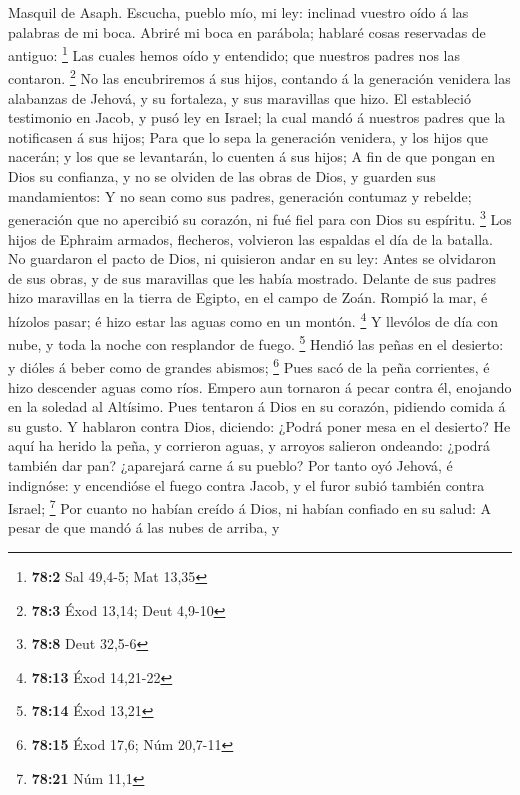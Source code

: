  Masquil de Asaph. Escucha, pueblo mío, mi ley: inclinad
vuestro oído á las palabras de mi boca.  Abriré mi boca en
parábola; hablaré cosas reservadas de antiguo: \footnote{\textbf{78:2}
  Sal 49,4-5; Mat 13,35}  Las cuales hemos oído y entendido;
que nuestros padres nos las contaron. \footnote{\textbf{78:3} Éxod
  13,14; Deut 4,9-10}  No las encubriremos á sus hijos,
contando á la generación venidera las alabanzas de Jehová, y su
fortaleza, y sus maravillas que hizo.  El estableció
testimonio en Jacob, y pusó ley en Israel; la cual mandó á nuestros
padres que la notificasen á sus hijos;  Para que lo sepa la
generación venidera, y los hijos que nacerán; y los que se levantarán,
lo cuenten á sus hijos;  A fin de que pongan en Dios su
confianza, y no se olviden de las obras de Dios, y guarden sus
mandamientos:  Y no sean como sus padres, generación
contumaz y rebelde; generación que no apercibió su corazón, ni fué fiel
para con Dios su espíritu. \footnote{\textbf{78:8} Deut 32,5-6}
 Los hijos de Ephraim armados, flecheros, volvieron las
espaldas el día de la batalla.  No guardaron el pacto de
Dios, ni quisieron andar en su ley:  Antes se olvidaron de
sus obras, y de sus maravillas que les había mostrado. 
Delante de sus padres hizo maravillas en la tierra de Egipto, en el
campo de Zoán.  Rompió la mar, é hízolos pasar; é hizo
estar las aguas como en un montón. \footnote{\textbf{78:13} Éxod
  14,21-22}  Y llevólos de día con nube, y toda la noche
con resplandor de fuego. \footnote{\textbf{78:14} Éxod 13,21}
 Hendió las peñas en el desierto: y dióles á beber como de
grandes abismos; \footnote{\textbf{78:15} Éxod 17,6; Núm 20,7-11}
 Pues sacó de la peña corrientes, é hizo descender aguas
como ríos.  Empero aun tornaron á pecar contra él, enojando
en la soledad al Altísimo.  Pues tentaron á Dios en su
corazón, pidiendo comida á su gusto.  Y hablaron contra
Dios, diciendo: ¿Podrá poner mesa en el desierto?  He aquí
ha herido la peña, y corrieron aguas, y arroyos salieron ondeando:
¿podrá también dar pan? ¿aparejará carne á su pueblo?  Por
tanto oyó Jehová, é indignóse: y encendióse el fuego contra Jacob, y el
furor subió también contra Israel; \footnote{\textbf{78:21} Núm 11,1}
 Por cuanto no habían creído á Dios, ni habían confiado en
su salud:  A pesar de que mandó á las nubes de arriba, y
